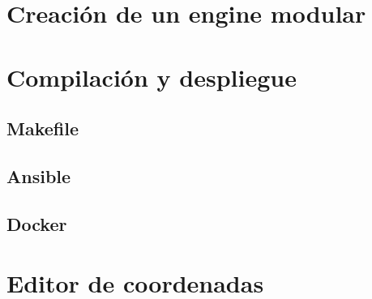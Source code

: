 \section{Creación de un engine modular}

\section{Compilación y despliegue}

\subsection{Makefile}

\subsection{Ansible}

\subsection{Docker}


\section{Editor de coordenadas}


